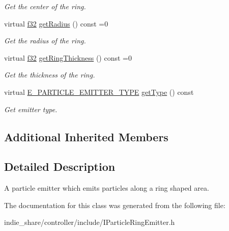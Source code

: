 \begin{DoxyCompactItemize}
\begin{DoxyCompactList}\small\item\em Get the center of the ring. \end{DoxyCompactList}\item 
\mbox{\label{classirr_1_1scene_1_1IParticleRingEmitter_af2a3e9b7a946359159e75d298968b6d8}} 
virtual \hyperlink{namespaceirr_a0277be98d67dc26ff93b1a6a1d086b07}{f32} \hyperlink{classirr_1_1scene_1_1IParticleRingEmitter_af2a3e9b7a946359159e75d298968b6d8}{get\+Radius} () const =0
\begin{DoxyCompactList}\small\item\em Get the radius of the ring. \end{DoxyCompactList}\item 
\mbox{\label{classirr_1_1scene_1_1IParticleRingEmitter_a6148ae3c6186d32f3714f83bbb71034c}} 
virtual \hyperlink{namespaceirr_a0277be98d67dc26ff93b1a6a1d086b07}{f32} \hyperlink{classirr_1_1scene_1_1IParticleRingEmitter_a6148ae3c6186d32f3714f83bbb71034c}{get\+Ring\+Thickness} () const =0
\begin{DoxyCompactList}\small\item\em Get the thickness of the ring. \end{DoxyCompactList}\item 
\mbox{\label{classirr_1_1scene_1_1IParticleRingEmitter_adbf6ff1bd1d25ee40e97bb17b152136f}} 
virtual \hyperlink{namespaceirr_1_1scene_a3e251a881c886884a78adea2e546272b}{E\+\_\+\+P\+A\+R\+T\+I\+C\+L\+E\+\_\+\+E\+M\+I\+T\+T\+E\+R\+\_\+\+T\+Y\+PE} \hyperlink{classirr_1_1scene_1_1IParticleRingEmitter_adbf6ff1bd1d25ee40e97bb17b152136f}{get\+Type} () const
\begin{DoxyCompactList}\small\item\em Get emitter type. \end{DoxyCompactList}\end{DoxyCompactItemize}
\subsection*{Additional Inherited Members}


\subsection{Detailed Description}
A particle emitter which emits particles along a ring shaped area. 

The documentation for this class was generated from the following file\+:\begin{DoxyCompactItemize}
\item 
indie\+\_\+share/controller/include/I\+Particle\+Ring\+Emitter.\+h\end{DoxyCompactItemize}
